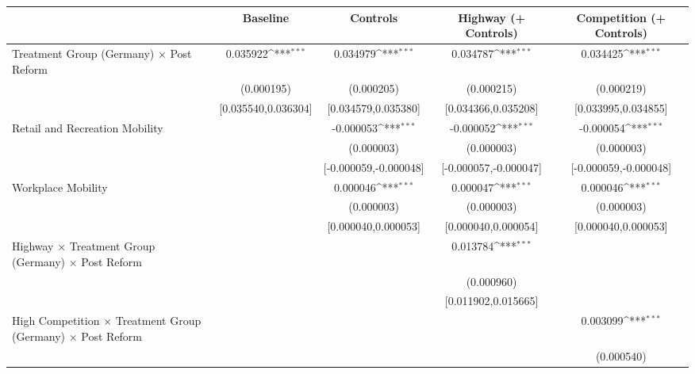 {
\def\sym#1{\ifmmode^{#1}\else\(^{#1}\)\fi}
\begin{tabular}{l*{4}{c}}
\toprule
                    &\multicolumn{1}{c}{Baseline}&\multicolumn{1}{c}{Controls}&\multicolumn{1}{c}{Highway (+ Controls)}&\multicolumn{1}{c}{Competition (+ Controls)}\\
\midrule
Treatment Group (Germany) $\times$ Post Reform&    0.035922\sym{***}&    0.034979\sym{***}&    0.034787\sym{***}&    0.034425\sym{***}\\
                    &  (0.000195)         &  (0.000205)         &  (0.000215)         &  (0.000219)         \\
                    &[0.035540,0.036304]         &[0.034579,0.035380]         &[0.034366,0.035208]         &[0.033995,0.034855]         \\
Retail and Recreation Mobility&                     &   -0.000053\sym{***}&   -0.000052\sym{***}&   -0.000054\sym{***}\\
                    &                     &  (0.000003)         &  (0.000003)         &  (0.000003)         \\
                    &                     &[-0.000059,-0.000048]         &[-0.000057,-0.000047]         &[-0.000059,-0.000048]         \\
Workplace Mobility  &                     &    0.000046\sym{***}&    0.000047\sym{***}&    0.000046\sym{***}\\
                    &                     &  (0.000003)         &  (0.000003)         &  (0.000003)         \\
                    &                     &[0.000040,0.000053]         &[0.000040,0.000054]         &[0.000040,0.000053]         \\
Highway $\times$ Treatment Group (Germany) $\times$ Post Reform&                     &                     &    0.013784\sym{***}&                     \\
                    &                     &                     &  (0.000960)         &                     \\
                    &                     &                     &[0.011902,0.015665]         &                     \\
High Competition $\times$ Treatment Group (Germany) $\times$ Post Reform&                     &                     &                     &    0.003099\sym{***}\\
                    &                     &                     &                     &  (0.000540)         \\

\end{tabular}}
